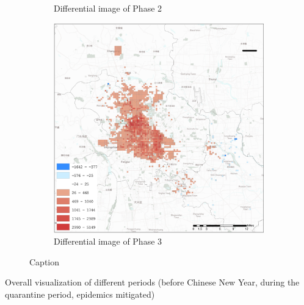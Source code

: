 \documentclass[preprints,ijgi,submit,moreauthors]{Definitions/mdpi}
\begin{document}
\begin{figure}[H]
\begin{subfigure}{.3\textwidth}
        \caption{Differential image of Phase 2}
    \end{subfigure}
        \begin{subfigure}{.3\textwidth}
        \includegraphics[width=\textwidth]{Figures/BSSMinusmp3.eps}
        \caption{Differential image of Phase 3}
    \end{subfigure}
    \caption{Caption}
    \label{fig:compare_2019_and_2020}
\end{figure}

Overall visualization of different periods (before Chinese New Year, during the quarantine period, epidemics mitigated)
\end{document}
